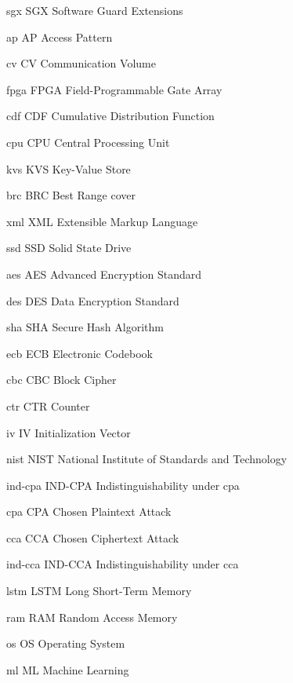 \newacronym%
	{sgx}
	{SGX}
	{Software Guard Extensions}

\newacronym%
	{ap}
	{AP}
	{Access Pattern}

\newacronym%
	{cv}
	{CV}
	{Communication Volume}

\newacronym%
	{fpga}
	{FPGA}
	{Field-Programmable Gate Array}

\newacronym%
	{cdf}
	{CDF}
	{Cumulative Distribution Function}

\newacronym%
	{cpu}
	{CPU}
	{Central Processing Unit}

\newacronym%
	{kvs}
	{KVS}
	{Key-Value Store}

\newacronym%
	{brc}
	{BRC}
	{Best Range cover}

\newacronym%
	{xml}
	{XML}
	{Extensible Markup Language}

\newacronym%
	{ssd}
	{SSD}
	{Solid State Drive}

\newacronym%
	{aes}
	{AES}
	{Advanced Encryption Standard}

\newacronym%
	{des}
	{DES}
	{Data Encryption Standard}

\newacronym%
	{sha}
	{SHA}
	{Secure Hash Algorithm}

\newacronym%
	{ecb}
	{ECB}
	{Electronic Codebook}

\newacronym%
	{cbc}
	{CBC}
	{Block Cipher}

\newacronym%
	{ctr}
	{CTR}
	{Counter}

\newacronym%
	{iv}
	{IV}
	{Initialization Vector}

\newacronym%
	{nist}
	{NIST}
	{National Institute of Standards and Technology}

\newacronym%
	{ind-cpa}
	{IND-CPA}
	{Indistinguishability under \acrlong{cpa}}

\newacronym%
	{cpa}
	{CPA}
	{Chosen Plaintext Attack}

\newacronym%
	{cca}
	{CCA}
	{Chosen Ciphertext Attack}

\newacronym%
	{ind-cca}
	{IND-CCA}
	{Indistinguishability under \acrlong{cca}}

\newacronym%
	{lstm}
	{LSTM}
	{Long Short-Term Memory}

\newacronym%
	{ram}
	{RAM}
	{Random Access Memory}

\newacronym%
	{os}
	{OS}
	{Operating System}

\newacronym%
	{ml}
	{ML}
	{Machine Learning}

